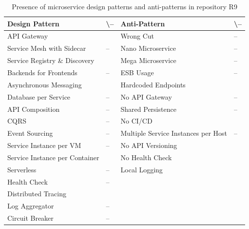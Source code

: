 \documentclass{Configuration_Files/PoliMi3i_thesis}
\newcommand{\cmark}{\ding{51}}%
\begin{document}
\begin{table}[H]
\centering 
    \begin{tabular}{ 
  | >{\centering\arraybackslash} m{16em} 
  | >{\centering\arraybackslash} m{2.2em} 
  | >{\centering\arraybackslash} m{16em} 
  | >{\centering\arraybackslash} m{2.2em} | }
    \hline
    \rowcolor{bluepoli!40}
    \textbf{Design Pattern} & \cmark \textbackslash – & \textbf{Anti-Pattern} & \cmark \textbackslash – \T\B \\
    \hline \hline
    API Gateway & \cmark & Wrong Cut & – \T\B\\
    \hline
    \rowcolor{bluepoli!10}
    Service Mesh with Sidecar & – & Nano Microservice & – \T\B \\
    \hline
    Service Registry \& Discovery & \cmark & Mega Microservice & – \T\B \\
    \hline
    \rowcolor{bluepoli!10}
    Backends for Frontends & – & ESB Usage & – \T\B \\
    \hline
    Asynchronous Messaging & \cmark & Hardcoded Endpoints & \cmark \T\B \\
    \hline
    \rowcolor{bluepoli!10}
    Database per Service & – & No API Gateway & – \T\B \\
    \hline
    API Composition & – & Shared Persistence & – \T\B \\
    \hline
    \rowcolor{bluepoli!10}
    CQRS & – & No CI/CD & \cmark \T\B \\
    \hline
    Event Sourcing & – & Multiple Service Instances per Host & – \T\B \\
    \hline
    \rowcolor{bluepoli!10}
    Service Instance per VM & – & No API Versioning & \cmark \T\B \\
    \hline
    Service Instance per Container & \cmark & No Health Check & \cmark \T\B \\
    \hline
    \rowcolor{bluepoli!10}
    Serverless & – & Local Logging & \cmark \T\B \\
    \hline
    Health Check & – &  & \T\B \\
    \hline
    \rowcolor{bluepoli!10}
    Distributed Tracing & \cmark & & \T\B \\
    \hline
    Log Aggregator & – &  & \T\B \\
    \hline
    \rowcolor{bluepoli!10}
    Circuit Breaker & – &  & \T\B \\
    \hline
    \end{tabular}
    \\[10pt]
    \caption{Presence of microservice design patterns and anti-patterns in repository R9}
    \label{table:R9_result}
\end{table}
\end{document}
